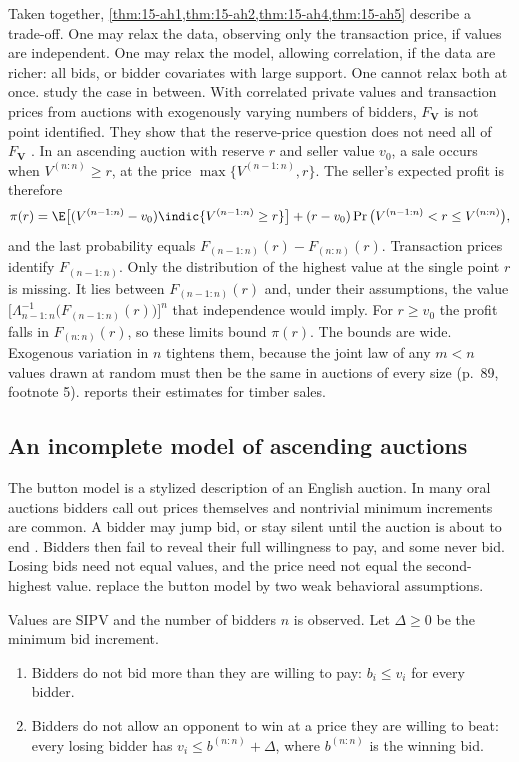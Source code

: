 Taken together, \cref{thm:15-ah1,thm:15-ah2,thm:15-ah4,thm:15-ah5} describe a trade-off. One may relax the data,
observing only the transaction price, if values are independent. One may relax the model, allowing correlation,
if the data are richer: all bids, or bidder covariates with large support. One cannot relax both at once.
\citet{AradillasLopezGandhiQuint2013} study the case in between. With correlated private values and transaction
prices from auctions with exogenously varying numbers of bidders, $F_{\bm V}$ is not point identified. They show
that the reserve-price question does not need all of $F_{\bm V}$ \citep[pp.~88--89]{HortacsuPerrigne2021}. In an
ascending auction with reserve $r$ and seller value $v_0$, a sale occurs when $V^{(n:n)}\ge r$, at the price
$\max\{V^{(n-1:n)},r\}$. The seller's expected profit is therefore
\[
\pi(r)=\E\big[(V^{(n-1:n)}-v_0)\indic\{V^{(n-1:n)}\ge r\}\big]+(r-v_0)\Pr\big(V^{(n-1:n)}<r\le V^{(n:n)}\big),
\]
and the last probability equals $F_{(n-1:n)}(r)-F_{(n:n)}(r)$. Transaction prices identify $F_{(n-1:n)}$. Only the
distribution of the highest value at the single point $r$ is missing. It lies between $F_{(n-1:n)}(r)$ and, under
their assumptions, the value $\big[\Lambda_{n-1:n}^{-1}\big(F_{(n-1:n)}(r)\big)\big]^n$ that independence would imply.
For $r\ge v_0$ the profit falls in $F_{(n:n)}(r)$, so these limits bound $\pi(r)$. The bounds are wide.
Exogenous variation in $n$ tightens them, because the joint law of any $m<n$ values drawn at random must then
be the same in auctions of every size (p.~89, footnote 5).  reports their estimates for
timber sales.

\subsection{An incomplete model of ascending auctions}\label{sec:15-ht}

The button model is a stylized description of an English auction. In many oral auctions bidders call out prices
themselves and nontrivial minimum increments are common. A bidder may jump bid, or stay silent until the auction is
about to end \citep[Section~4.3]{AtheyHaile2007}. Bidders then fail to reveal their full willingness to
pay, and some never bid. Losing bids need not equal values, and the price need not equal the second-highest value.
\citet{HaileTamer2003} replace the button model by two weak behavioral assumptions.

\begin{assumption}\label{ass:15-ht}
Values are SIPV and the number of bidders $n$ is observed. Let $\Delta\ge0$ be the minimum bid increment.
\begin{enumerate}[label=(HT\arabic*),leftmargin=*]
\item Bidders do not bid more than they are willing to pay: $b_i\le v_i$ for every bidder.
\item Bidders do not allow an opponent to win at a price they are willing to beat: every losing bidder has
$v_i\le b^{(n:n)}+\Delta$, where $b^{(n:n)}$ is the winning bid.
\end{enumerate}
\end{assumption}

